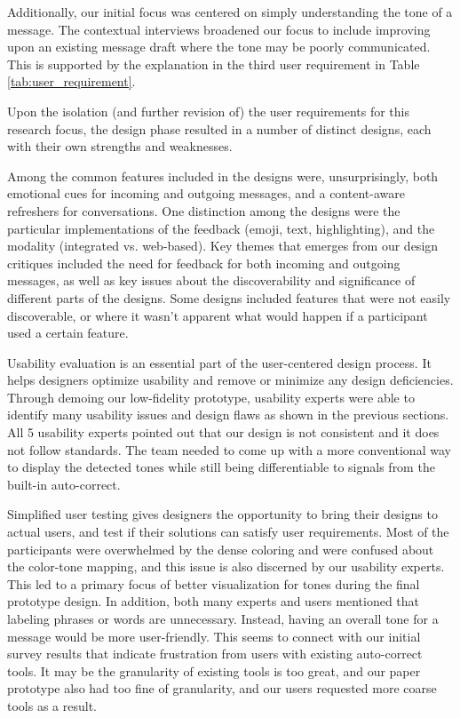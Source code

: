 \documentclass[acmsmall,screen,authorversion,nonacm]{acmart}
\begin{document}
Additionally, our initial focus was centered on simply understanding the tone of a message. The contextual interviews broadened our focus to include improving upon an existing message draft where the tone may be poorly communicated. This is supported by the explanation in the third user requirement in Table \ref{tab:user_requirement}.

Upon the isolation (and further revision of) the user requirements for this research focus, the design phase resulted in a number of distinct designs, each with their own strengths and weaknesses.

Among the common features included in the designs were, unsurprisingly, both emotional cues for incoming and outgoing messages, and a content-aware refreshers for conversations. One distinction among the designs were the particular implementations of the feedback (emoji, text, highlighting), and the modality (integrated vs. web-based). Key themes that emerges from our design critiques included the need for feedback for both incoming and outgoing messages, as well as key issues about the discoverability and significance of different parts of the designs. Some designs included features that were not easily discoverable, or where it wasn't apparent what would happen if a participant used a certain feature. 

Usability evaluation is an essential part of the user-centered design process. It helps designers optimize usability and remove or minimize any design deficiencies. Through demoing our low-fidelity prototype, usability experts were able to identify many usability issues and design flaws as shown in the previous sections. All 5 usability experts pointed out that our design is not consistent and it does not follow standards. The team needed to come up with a more conventional way to display the detected tones while still being differentiable to signals from the built-in auto-correct.

Simplified user testing gives designers the opportunity to bring their designs to actual users, and test if their solutions can satisfy user requirements. Most of the participants were overwhelmed by the dense coloring and were confused about the color-tone mapping, and this issue is also discerned by our usability experts. This led to a primary focus of better visualization for tones during the final prototype design. In addition, both many experts and users mentioned that labeling phrases or words are unnecessary. Instead, having an overall tone for a message would be more user-friendly. This seems to connect with our initial survey results that indicate frustration from users with existing auto-correct tools. It may be the granularity of existing tools is too great, and our paper prototype also had too fine of granularity, and our users requested more coarse tools as a result.
\end{document}

